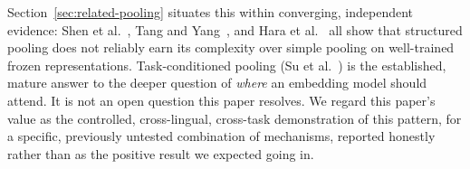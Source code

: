 \documentclass[manuscript]{acmart}
\begin{document}
\begin{table}[h]
\caption{How the twenty-two comparisons decompose: task type, language, count, and how many favor the linear head.}
\label{tab:comparison-count}
\end{table} Section~\ref{sec:related-pooling} situates this within converging, independent evidence: Shen et al.~\citep{shen2018baseline}, Tang and Yang~\citep{tang2024poolingattention}, and Hara et al.~\citep{hara2026meanpooling} all show that structured pooling does not reliably earn its complexity over simple pooling on well-trained frozen representations. Task-conditioned pooling (Su et al.~\citep{su2022instructor}) is the established, mature answer to the deeper question of \emph{where} an embedding model should attend. It is not an open question this paper resolves. We regard this paper's value as the controlled, cross-lingual, cross-task demonstration of this pattern, for a specific, previously untested combination of mechanisms, reported honestly rather than as the positive result we expected going in.
\end{document}
